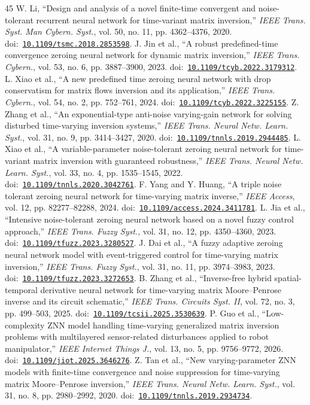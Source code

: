 \documentclass{ieeeaccess}
\newcommand{\refdoi}[1]{doi:~\href{https://doi.org/#1}{\nolinkurl{#1}}}
\begin{document}
\begin{thebibliography}{45}
 W. Li, ``Design and analysis of a novel finite-time convergent and noise-tolerant recurrent neural network for time-variant matrix inversion,'' \emph{IEEE Trans. Syst. Man Cybern. Syst.}, vol. 50, no. 11, pp. 4362--4376, 2020. \refdoi{10.1109/tsmc.2018.2853598}.
 J. Jin et al., ``A robust predefined-time convergence zeroing neural network for dynamic matrix inversion,'' \emph{IEEE Trans. Cybern.}, vol. 53, no. 6, pp. 3887--3900, 2023. \refdoi{10.1109/tcyb.2022.3179312}.
 L. Xiao et al., ``A new predefined time zeroing neural network with drop conservatism for matrix flows inversion and its application,'' \emph{IEEE Trans. Cybern.}, vol. 54, no. 2, pp. 752--761, 2024. \refdoi{10.1109/tcyb.2022.3225155}.
 Z. Zhang et al., ``An exponential-type anti-noise varying-gain network for solving disturbed time-varying inversion systems,'' \emph{IEEE Trans. Neural Netw. Learn. Syst.}, vol. 31, no. 9, pp. 3414--3427, 2020. \refdoi{10.1109/tnnls.2019.2944485}.
 L. Xiao et al., ``A variable-parameter noise-tolerant zeroing neural network for time-variant matrix inversion with guaranteed robustness,'' \emph{IEEE Trans. Neural Netw. Learn. Syst.}, vol. 33, no. 4, pp. 1535--1545, 2022. \refdoi{10.1109/tnnls.2020.3042761}.
 F. Yang and Y. Huang, ``A triple noise tolerant zeroing neural network for time-varying matrix inverse,'' \emph{IEEE Access}, vol. 12, pp. 82277--82288, 2024. \refdoi{10.1109/access.2024.3411781}.
 L. Jia et al., ``Intensive noise-tolerant zeroing neural network based on a novel fuzzy control approach,'' \emph{IEEE Trans. Fuzzy Syst.}, vol. 31, no. 12, pp. 4350--4360, 2023. \refdoi{10.1109/tfuzz.2023.3280527}.
 J. Dai et al., ``A fuzzy adaptive zeroing neural network model with event-triggered control for time-varying matrix inversion,'' \emph{IEEE Trans. Fuzzy Syst.}, vol. 31, no. 11, pp. 3974--3983, 2023. \refdoi{10.1109/tfuzz.2023.3272653}.
 B. Zhang et al., ``Inverse-free hybrid spatial-temporal derivative neural network for time-varying matrix Moore--Penrose inverse and its circuit schematic,'' \emph{IEEE Trans. Circuits Syst. II}, vol. 72, no. 3, pp. 499--503, 2025. \refdoi{10.1109/tcsii.2025.3530639}.
 P. Guo et al., ``Low-complexity ZNN model handling time-varying generalized matrix inversion problems with multilayered sensor-related disturbances applied to robot manipulator,'' \emph{IEEE Internet Things J.}, vol. 13, no. 5, pp. 9756--9772, 2026. \refdoi{10.1109/jiot.2025.3646276}.
 Z. Tan et al., ``New varying-parameter ZNN models with finite-time convergence and noise suppression for time-varying matrix Moore--Penrose inversion,'' \emph{IEEE Trans. Neural Netw. Learn. Syst.}, vol. 31, no. 8, pp. 2980--2992, 2020. \refdoi{10.1109/tnnls.2019.2934734}.

\end{thebibliography}
\end{document}
